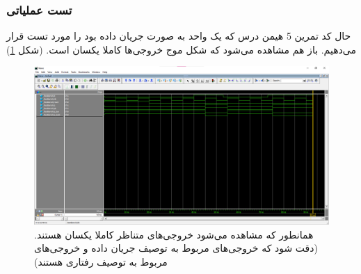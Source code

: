 \documentclass[fleqn]{article}
\begin{document}
\subsubsection{تست عملیاتی}
حال کد تمرین 5 هیمن درس که یک واحد
به صورت جریان داده بود را مورد تست قرار می‌دهیم. باز هم مشاهده می‌شود که شکل موج خروجی‌ها کاملا یکسان است. (شکل \ref{test2for7})

\begin{figure}[!htbp]
	\centering
	\includegraphics[width=\linewidth]{7test2.png}
	\caption{همانطور که مشاهده می‌شود خروجی‌های متناظر کاملا یکسان هستند. (دقت شود که خروجی‌های  مربوط به توصیف جریان داده و خروجی‌های  مربوط به توصیف رفتاری هستند)}
	\label{test2for7}
\end{figure}
\end{document}
